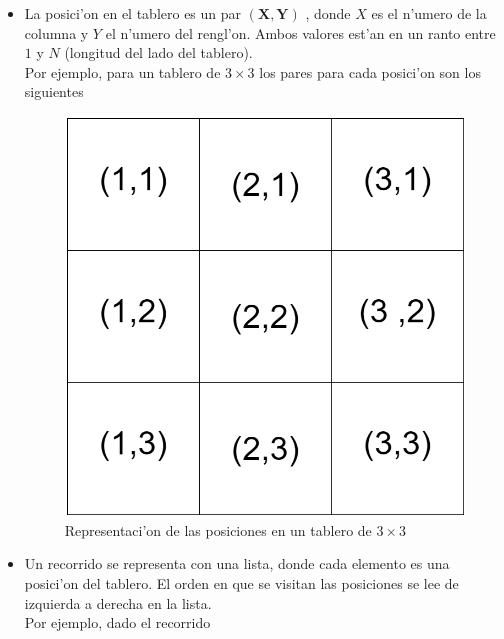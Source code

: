 \documentclass[12pt]{article}
\begin{document}
    \begin{itemize}
        \item La posici'on en el tablero es un par  $\mathbf{(X,Y)}$ , donde
        $X$ es el n'umero de la columna y $Y$ el n'umero del rengl'on.
        Ambos valores est'an en un ranto entre $1$ y $N$ (longitud
        del lado del tablero). \\
        Por ejemplo, para un tablero de $3\times 3$ los
        pares para cada posici'on son los siguientes

        \begin{figure}[H]
            \centering
            \includegraphics[scale=0.25]{tablero_posiciones.png}
            \caption{Representaci'on de las posiciones en un tablero de $3\times 3$}
            \label{fig: posiciones}
        \end{figure}



        \item Un recorrido se representa con una lista, donde cada elemento
        es una posici'on del tablero. El orden en que se visitan las
        posiciones se lee de izquierda a derecha en la lista.\\
        Por ejemplo, dado el recorrido


\end{itemize}
\end{document}
